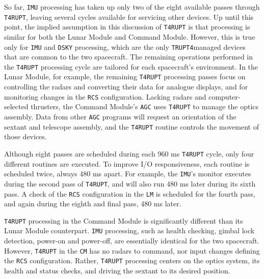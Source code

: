 \documentclass[refcap, oxford]{ahsan}
\begin{document}
So far, \texttt{IMU} processing has taken up only two of the eight available passes through \texttt{T4RUPT}, leaving several cycles available for servicing other devices. Up until this point, the implied assumption in this discussion of \texttt{T4RUPT} is that processing is similar for both the Lunar Module and Command Module. However, this is true only for \texttt{IMU} and \texttt{DSKY} processing, which are the only \texttt{TRUPT4}managed devices that are common to the two spacecraft. The remaining operations performed in the \texttt{T4RUPT} processing cycle are tailored for each spacecraft's environment. In the Lunar Module, for example, the remaining \texttt{T4RUPT} processing passes focus on controlling the radars and converting their data for analogue displays, and for monitoring changes in the \texttt{RCS} configuration. Lacking radars and computer-selected thrusters, the Command Module's \texttt{AGC} uses \texttt{T4RUPT} to manage the optics assembly. Data from other \texttt{AGC} programs will request an orientation of the sextant and telescope assembly, and the \texttt{T4RUPT} routine controls the movement of those devices.

Although eight passes are scheduled during each 960 ms \texttt{T4RUPT} cycle, only four different routines are executed. To improve I/O responsiveness, each routine is scheduled twice, always 480 ms apart. For example, the \texttt{IMU}'s monitor executes during the second pass of \texttt{T4RUPT}, and will also run 480 ms later during its sixth\\
pass. A check of the \texttt{RCS} configuration in the \texttt{LM} is scheduled for the fourth pass, and again during the eighth and final pass, 480 ms later.

\texttt{T4RUPT} processing in the Command Module is significantly different than its Lunar Module counterpart. \texttt{IMU} processing, such as health checking, gimbal lock detection, power-on and power-off, are essentially identical for the two spacecraft. However, \texttt{T4RUPT} in the \texttt{CM} has no radars to command, nor input changes defining the \texttt{RCS} configuration. Rather, \texttt{T4RUPT} processing centers on the optics system, its health and status checks, and driving the sextant to its desired position.
\end{document}

